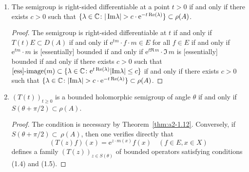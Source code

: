 \begin{example}
\begin{enumerate}[\upshape (i), wide, labelindent=.5em]
\begin{proof}
By hypothesis, the set 
$H \coloneqq \{m(x) \colon x \in X, \Re(m(x)) \geq b\}$ 
in the case $E = C_{0}(X)$ 
and $H \coloneqq \{m(x) \colon \Re(\lambda) \geq b \text{ and for all } \eta > 0, 
\mu(\{x \in X \colon |m(x)-\lambda| < \eta \}) \neq 0\}$
in the case $E = L^{p}$ 
is a bounded subset of $\C$.
Thus $\lim_{t \to t'} |\mathrm{e}^{tz} - \mathrm{e}^{t'z}| = 0$ 
uniformly for $z \in H$.
Hence there exists $\delta \in \left]0,1\right]$ such that
\[
[\text{ess}]\text{-}\sup\{|\mathrm{e}^{tm(x)} - \mathrm{e}^{t'm(x)}| \colon x \in X, \Re(m(x)) > b\} < \epsilon
\] 
whenever $|t-t'| < \delta$.
Together with the inequality above, we obtain that 
\[
\|T(t) - T(t')\| = [\text{ess}]\text{-}\sup\{|\mathrm{e}^{tm(x)} - \mathrm{e}^{t'm(x)}| \colon x \in X\} < \epsilon
\]
whenever $|t-t'| < \delta$.
We have shown that the semigroup is norm continuous for $t > 0$ whenever $\{\lambda \in \sigma(A) \colon \Re(\lambda) \geq b\}$ is bounded for all $b \in \R$.
\end{proof}

\item \label{ex:a2-1.28-2}
The semigroup is right-sided differentiable at a point
$t > 0$ 
if and only if there exists $c > 0$ such that 
$\{\lambda \in \mathbb{C} \colon |\mathop{}\!\mathrm{Im} \lambda| > c \cdot \mathrm{e}^{-t\mathop{}\!\mathrm{Re}(\lambda)}\} \subset \rho(A)$.

\begin{proof}
The semigroup is right-sided differentiable at $t$ 
if and only if $T(t)E \subset D(A)$ 
if and only if $\mathrm{e}^{tm} \cdot f \cdot m \in E$ for all $f \in E$ 
if and only if $\mathrm{e}^{tm} \cdot m$ is [essentially] bounded 
if and only if $\mathrm{e}^{t\Re\, m} \cdot \Im\, m$ is [essentially] bounded 
if and only if there exists $c > 0$ such that 
$[\text{ess}]\text{-}\text{image}(m) \subset 
\{\lambda \in \mathbb{C} \colon \mathrm{e}^{t\mathop{}\!\mathrm{Re}(\lambda)}|\text{Im}\lambda| \leq c\}$ 
if and only if there exists $c > 0$ such that 
$\{\lambda \in \mathbb{C} \colon |\text{Im}\lambda| > c \cdot \mathrm{e}^{-t\mathop{}\!\mathrm{Re}(\lambda)}\} \subset \rho(A)$.
\end{proof}

\item \label{ex:a2-1.28-3}
$(T(t))_{t \geq 0}$ is a bounded holomorphic semigroup of angle $\theta$ if and only if \\
$S(\theta + \pi/2) \subset \rho(A)$.

\begin{proof}
The condition is necessary by Theorem~\ref{thm:a2-1.12}.
Conversely, if $S(\theta + \pi/2) \subset~\rho(A)$, 
then one verifies directly that 
\[
(T(z)f)(x) = \mathrm{e}^{z \cdot m(x)}f(x) \quad (f \in E, x \in X) 
\]
defines a family $(T(z))_{z \in S(\theta)}$ of bounded operators satisfying conditions (1.4) and (1.5).
\end{proof}


\end{enumerate}
\end{example}
